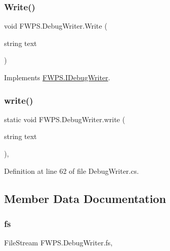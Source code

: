 \subsubsection{\texorpdfstring{Write()}{Write()}}
{\footnotesize\ttfamily void F\+W\+P\+S.\+Debug\+Writer.\+Write (\begin{DoxyParamCaption}\item[{string}]{text }\end{DoxyParamCaption})}



Implements \mbox{\hyperlink{interface_f_w_p_s_1_1_i_debug_writer_a826f82ffa90498afa817f5eef274d5dc}{F\+W\+P\+S.\+I\+Debug\+Writer}}.

\mbox{\label{class_f_w_p_s_1_1_debug_writer_ae0d1317c605cc562554c3614071c6de3}} 
\subsubsection{\texorpdfstring{write()}{write()}}
{\footnotesize\ttfamily static void F\+W\+P\+S.\+Debug\+Writer.\+write (\begin{DoxyParamCaption}\item[{string}]{text }\end{DoxyParamCaption})\hspace{0.3cm}{\ttfamily [static]}, {\ttfamily [private]}}



Definition at line 62 of file Debug\+Writer.\+cs.



\subsection{Member Data Documentation}
\mbox{\label{class_f_w_p_s_1_1_debug_writer_a1b42179cea7cb765bacf1ec804e7e30f}} 
\subsubsection{\texorpdfstring{fs}{fs}}
{\footnotesize\ttfamily File\+Stream F\+W\+P\+S.\+Debug\+Writer.\+fs\hspace{0.3cm}{\ttfamily [static]}, {\ttfamily [private]}}



